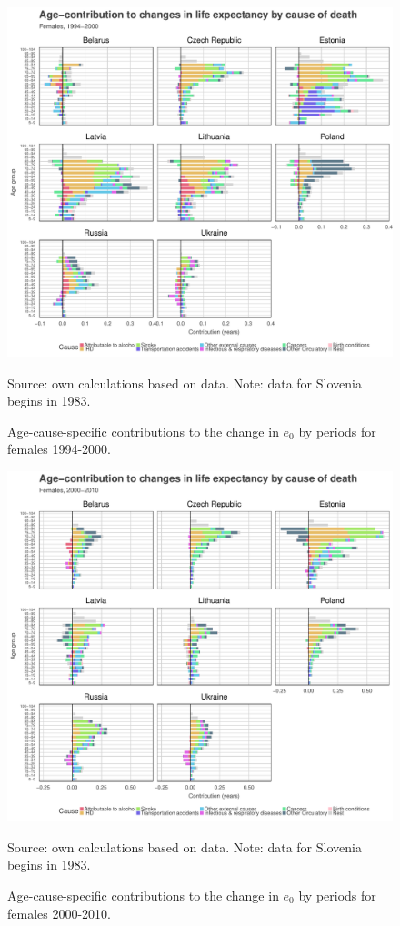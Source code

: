 \documentclass{article}
\begin{document}
\newpage

\begin{figure}[h!]
\caption{Age-cause-specific contributions to the change in $e_0$ by periods for females 1994-2000.}
\centering
\begin{center}
\includegraphics[scale=.5]{Figures/Cause_e0_decomp_Females_1.pdf}
\end{center}
Source: own calculations based on \citet{HMD} data. Note: data for Slovenia begins in 1983.
\end{figure}

\newpage

\begin{figure}[h!]
\caption{Age-cause-specific contributions to the change in $e_0$ by periods for females 2000-2010.}
\centering
\begin{center}
\includegraphics[scale=.5]{Figures/Cause_e0_decomp_Females_2.pdf}
\end{center}
Source: own calculations based on \citet{HMD} data. Note: data for Slovenia begins in 1983.
\end{figure}
\end{document}
